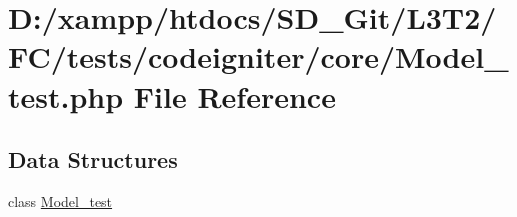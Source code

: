 \hypertarget{_model__test_8php}{}\section{D\+:/xampp/htdocs/\+S\+D\+\_\+\+Git/\+L3\+T2/\+F\+C/tests/codeigniter/core/\+Model\+\_\+test.php File Reference}
\label{_model__test_8php}
\subsection*{Data Structures}
\begin{DoxyCompactItemize}
\item 
class \hyperlink{class_model__test}{Model\+\_\+test}
\end{DoxyCompactItemize}
